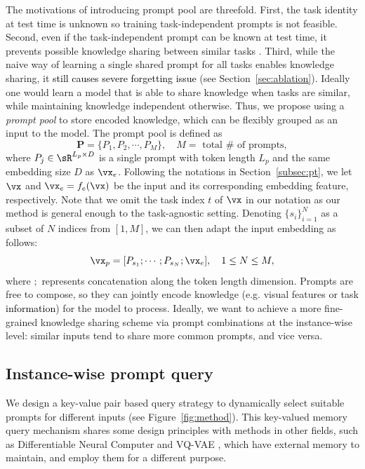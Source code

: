 \documentclass[10pt,twocolumn,letterpaper]{article}
\newcommand{\zifeng}[1]{\textcolor{black}{#1}}
\def\pp{\mathbf{P}}
\begin{document}
The motivations of introducing prompt pool are threefold. 
First, the task identity at test time is unknown so training task-independent prompts is not feasible.
Second, even if the task-independent prompt can be known at test time, it prevents possible knowledge sharing between similar tasks \cite{hadsell2020embracing}. 
Third, while the naive way of learning a single shared prompt for all tasks enables knowledge sharing, it \zifeng{still causes severe forgetting issue} (see Section~\ref{sec:ablation}).
Ideally one would learn a model that is able to share knowledge when tasks are similar, while maintaining knowledge independent otherwise. 
Thus, we propose using a \emph{prompt pool} to store encoded knowledge, which can be flexibly grouped as an input to the model. 
The prompt pool is defined as 
\begin{equation}
\label{eq:prompt_pool}
    \pp=\{P_1, P_2, \cdots, P_M\}, \quad \text{$M = $ total $\#$ of prompts},
\end{equation}
where $P_j \in \sR^{L_p\times D}$ is a single prompt with token length $L_p$ and the same embedding size $D$ as $\vx_e$.
Following the notations in Section~\ref{subsec:pt}, we let $\vx$ and $\vx_e = f_e(\vx)$ be the input and its corresponding embedding feature, respectively. Note that we omit the task index $t$ of $\vx$ in our notation as our method is general enough to the task-agnostic setting. 
Denoting $\{s_i\}_{i=1}^{N}$ as a subset of $N$ indices from $[1, M]$, we can then adapt the input embedding as follows:
\begin{equation}
\label{eq:prompt_input}
    \vx_p = [P_{s_1}; \cdots; P_{s_N}; \vx_e], \quad 1 \leq N \leq M,
\end{equation}
where $;$ represents concatenation along the token length dimension.
Prompts are free to compose, so they can jointly encode knowledge (e.g. visual features or task \zifeng{information}) for the model to process. 
Ideally, we want to achieve a more fine-grained knowledge sharing scheme via prompt combinations at the instance-wise level: similar inputs tend to share more common prompts, and vice versa. 



\subsection{Instance-wise prompt query} \label{sec:query}

We design a key-value pair based query strategy to dynamically select suitable prompts for different inputs (see Figure~\ref{fig:method}). 
This key-valued memory query mechanism shares some design principles with methods in other fields, such as Differentiable Neural Computer \cite{graves2016hybrid} and VQ-VAE \cite{oord2017neural}, which have external memory to maintain, and employ them for a different purpose.
\end{document}

